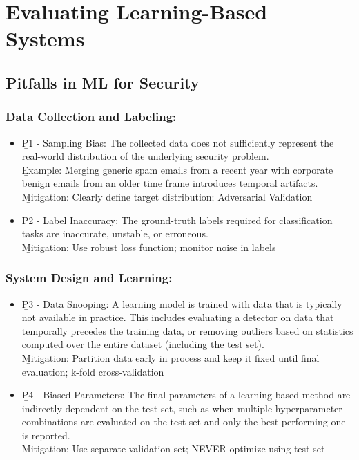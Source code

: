 \section{Evaluating Learning-Based Systems}

\subsection{Pitfalls in ML for Security}

\subsubsection*{Data Collection and Labeling:}
\begin{itemize}
    \item \b{P1 - Sampling Bias}: The collected data does not sufficiently represent the real-world distribution of the underlying security problem.\\[.5em]
    \b{Example:} Merging generic spam emails from a recent year with corporate benign emails from an older time frame introduces temporal artifacts.\\[.5em]
    \b{Mitigation}: Clearly define target distribution; Adversarial Validation
    \item \b{P2 - Label Inaccuracy}: The ground-truth labels required for classification tasks are inaccurate, unstable, or erroneous.\\[.5em]
    \b{Mitigation}: Use robust loss function; monitor noise in labels
\end{itemize}



\subsubsection*{System Design and Learning:}
\begin{itemize}
    \item \b{P3 - Data Snooping}: A learning model is trained with data that is typically not available in practice. This includes evaluating a detector on data that temporally precedes the training data, or removing outliers based on statistics computed over the entire dataset (including the test set).\\[.5em]
    \b{Mitigation}: Partition data early in process and keep it fixed until final evaluation; k-fold cross-validation
    \item \b{P4 - Biased Parameters}: The final parameters of a learning-based method are indirectly dependent on the test set, such as when multiple hyperparameter combinations are evaluated on the test set and only the best performing one is reported.\\[.5em]
    \b{Mitigation}: Use separate validation set; NEVER optimize using test set
\end{itemize}


